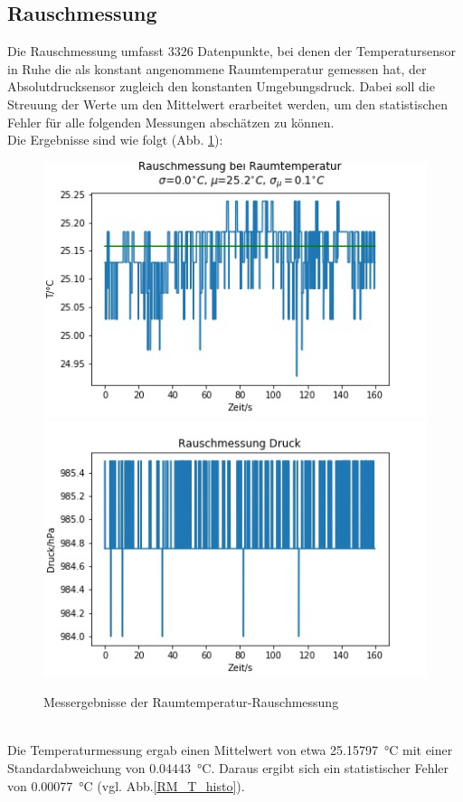 \documentclass[]{article}
\begin{document}
\subsection{Rauschmessung}
Die Rauschmessung umfasst 3326 Datenpunkte, bei denen der Temperatursensor in Ruhe die als konstant angenommene Raumtemperatur gemessen hat, der Absolutdrucksensor zugleich den konstanten Umgebungsdruck. Dabei soll die Streuung der Werte um den Mittelwert erarbeitet werden, um den statistischen Fehler für alle folgenden Messungen abschätzen zu können.\\
Die Ergebnisse sind wie folgt (Abb. \ref{RM_T_p}):\\
\begin{figure}[h]
	\begin{center}
		\includegraphics[scale=0.45]{Images/RauschmessungRT_T.jpg}
		\includegraphics[scale=0.45]{Images/RauschmessungRT_p.jpg}
		\caption{Messergebnisse der Raumtemperatur-Rauschmessung}
		\label{RM_T_p}
	\end{center}
\end{figure}\\
Die Temperaturmessung ergab einen Mittelwert von etwa \SI{25.15797}{\celsius} mit einer Standardabweichung von \SI{0.04443}{\celsius}.  Daraus ergibt sich ein statistischer Fehler von \SI{0.00077}{\celsius} (vgl. Abb.\ref{RM_T_histo}).\\
\end{document}
